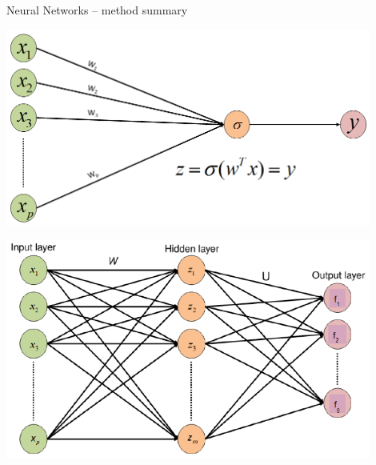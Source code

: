 \begin{frame}{Neural Networks -- method summary}
\smallskip
\begin{center}
\begin{minipage}[b]{0.24\textwidth}
  \includegraphics[width=0.9\textwidth]{figure/nn-single-neuron} \\
\end{minipage}%
\begin{minipage}[b]{0.24\textwidth}
  \includegraphics[width=0.9\textwidth]{figure/nn-feedforward} \\
\end{minipage}%
\end{center}


\end{frame}


